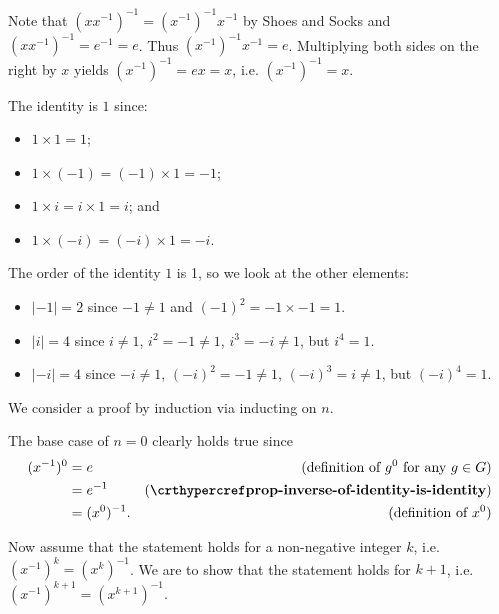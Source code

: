 \begin{questions}
    \item Note that $(xx^{-1})^{-1} = (x^{-1})^{-1}x^{-1}$ by Shoes and Socks and $(xx^{-1})^{-1} = e^{-1} = e$. Thus $(x^{-1})^{-1}x^{-1} = e$. Multiplying both sides on the right by $x$ yields $(x^{-1})^{-1} = ex = x$, i.e. $(x^{-1})^{-1} = x$.
    \item \begin{partquestions}{\roman*}
        \item The identity is $1$ since:
        \begin{itemize}
            \item $1 \times 1 = 1$;
            \item $1 \times (-1) = (-1) \times 1 = -1$;
            \item $1 \times i = i \times 1 = i$; and
            \item $1 \times (-i) = (-i) \times 1 = -i$.
        \end{itemize}
        \item The order of the identity $1$ is 1, so we look at the other elements:
        \begin{itemize}
            \item $|-1| = 2$ since $-1 \neq 1$ and $(-1)^2 = -1 \times -1 = 1$.
            \item $|i| = 4$ since $i \neq 1$, $i^2 = -1 \neq 1$, $i^3 = -i \neq 1$, but $i^4 = 1$.
            \item $|-i| = 4$ since $-i \neq 1$, $(-i)^2 = -1 \neq 1$, $(-i)^3 = i \neq 1$, but $(-i)^4 = 1$.
        \end{itemize}
    \end{partquestions}

    \item We consider a proof by induction via inducting on $n$.
    
    The base case of $n = 0$ clearly holds true since
    \begin{align*}
        (x^{-1})^0 &= e & (\text{definition of }g^0 \text{ for any }g\in G)\\
        &= e^{-1} & (\myref{prop-inverse-of-identity-is-identity})\\
        &= (x^0)^{-1}. & (\text{definition of }x^0)
    \end{align*}

    Now assume that the statement holds for a non-negative integer $k$, i.e. $(x^{-1})^k = (x^k)^{-1}$. We are to show that the statement holds for $k+1$, i.e. $(x^{-1})^{k+1} = (x^{k+1})^{-1}$.


\end{questions}
